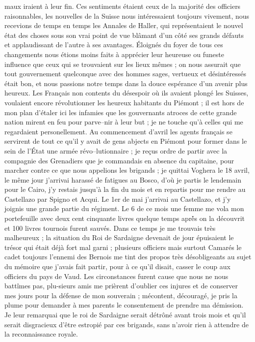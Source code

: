 \documentclass[12pt]{article}
\begin{document}
 maux iraient à leur fin. Ces sentiments étaient ceux de
la majorité des officiers raisonnables, les nouvelles de la Suisse nous intéressaient toujours
vivement, nous recevions de temps en temps les Annales de Haller, qui représentaient le nouvel état
des choses sous son vrai point de vue blâmant d’un côté ses grands défauts et applaudissant de
l’autre à ses avantages. Éloignés du foyer de tous ces changements nous étions moins faits à
apprécier leur heureuse ou funeste influence que ceux qui se trouvaient sur les lieux mêmes ; on
nous assurait que tout gouvernement quelconque avec des hommes sages, vertueux et désintéressés
était bon, et nous passions notre temps dans la douce espérance d’un avenir plus heureux. Les
Français non contents du désespoir où ils avaient plongé les Suisses, voulaient encore révolutionner
les heureux habitants du Piémont ; il est hors de mon plan d’étaler ici les infamies que les
gouvernants atroces de cette grande nation mirent en feu pour parve–nir à leur but ; je ne touche
qu’à celles qui me regardaient personellement. Au commencement d’avril les agents français se
servirent de tout ce qu’il y avait de gens abjects en Piémont pour former dans le sein de l’État une
armée révo–lutionnaire ; je reçus ordre de partir avec la compagnie des Grenadiers que je commandais
en absence du capitaine, pour marcher contre ce que nous appelions les brigands ; je quittai Voghera
le 18 avril, le même jour j’arrivai harassé de fatigues au Bosco, d’où je partis le lendemain pour
le Cairo, j’y restais jusqu’à la fin du mois et en repartis pour me rendre au Castellazo par Spigno
et Acqui. Le 1er de mai j’arrivai au Castellazo, et j’y joignis une grande partie du régiment. Le 6
de ce mois une femme me vola mon portefeuille avec deux cent cinquante livres quelque temps aprè́s
on la découvrit et 100 livres tournois furent sauvés. Dans ce temps je me trouvais très malheureux ;
la situation du Roi de Sardaigne devenait de jour épuisaient le trésor qui était déjà fort mal garni
; plusieurs officiers mais surtout Camarés le cadet toujours l’ennemi des Bernois me tint des propos
très désobligeants au sujet du mémoire que j’avais fait partir, pour à ce qu’il disait, casser le
coup aux officiers du pays de Vaud. Les circonstances furent cause que nous ne nous battîmes pas,
plu-sieurs amis me prièrent d’oublier ces injures et de conserver mes jours pour la défense de mon
souverain ; mécontent, découragé, je pris la plume pour demander à mes parents le consentement de
prendre ma démission. Je leur remarquai que le roi de Sardaigne serait détrôné avant trois mois et
qu’il serait disgracieux d’être estropié par ces brigands, sans n’avoir rien à attendre de la
reconnaissance royale.
\end{document}
